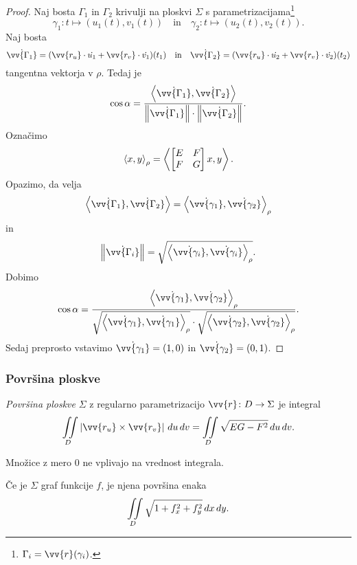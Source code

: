 
\begin{proof}
Naj bosta $\Gamma_1$ in $\Gamma_2$ krivulji na ploskvi $\Sigma$ s
parametrizacijama\footnote{$\Gamma_i = \vv{r}(\gamma_i)$.}
\[
\gamma_1 \colon t \mapsto (u_1(t), v_1(t))
\quad \text{in} \quad
\gamma_2 \colon t \mapsto (u_2(t), v_2(t)).
\]
Naj bosta
\[
\dot{\vv{\Gamma_1}} =
(\vv{r_u} \cdot \dot{u_1} + \vv{r_v} \cdot \dot{v_1})(t_1)
\quad \text{in} \quad
\dot{\vv{\Gamma_2}} =
(\vv{r_u} \cdot \dot{u_2} + \vv{r_v} \cdot \dot{v_2})(t_2)
\]
tangentna vektorja v $\rho$. Tedaj je
\[
\cos \alpha = \frac{\skl{\dot{\vv{\Gamma_1}}, \dot{\vv{\Gamma_2}}}}{\norm{\dot{\vv{\Gamma_1}}} \cdot \norm{\dot{\vv{\Gamma_2}}}}.
\]
Označimo
\[
\left\langle x,y\right\rangle_\rho = \left\langle 
\begin{bmatrix}
E & F \\
F & G
\end{bmatrix}
x, y\right\rangle.
\]
Opazimo, da velja
\[
\skl{\dot{\vv{\Gamma_1}}, \dot{\vv{\Gamma_2}}} =
\skl{\dot{\vv{\gamma_1}}, \dot{\vv{\gamma_2}}}_\rho
\]
in
\[
\norm{\dot{\vv{\Gamma_i}}} =
\sqrt{\skl{\dot{\vv{\gamma_i}}, \dot{\vv{\gamma_i}}}_\rho}.
\]
Dobimo
\[
\cos \alpha =
\frac{\skl{\dot{\vv{\gamma_1}}, \dot{\vv{\gamma_2}}}_\rho}
{\sqrt{\skl{\dot{\vv{\gamma_1}}, \dot{\vv{\gamma_1}}}_\rho}
\cdot
\sqrt{\skl{\dot{\vv{\gamma_2}}, \dot{\vv{\gamma_2}}}_\rho}}.
\]
Sedaj preprosto vstavimo $\dot{\vv{\gamma_1}} = (1,0)$ in
$\dot{\vv{\gamma_2}} = (0,1)$.
\end{proof}

\subsubsection{Površina ploskve}

\begin{definicija}
\emph{Površina ploskve} $\Sigma$ z
regularno parametrizacijo $\vv{r} \colon D \to \Sigma$ je integral
\[
\liint_D \abs{\vv{r_u} \times \vv{r_v}}\,du\,dv =
\liint_D \sqrt{EG - F^2}\,du\,dv.
\]
\end{definicija}

\begin{opomba}
Množice z mero $0$ ne vplivajo na vrednost integrala.
\end{opomba}

\begin{posledica}
Če je $\Sigma$ graf funkcije $f$, je njena površina enaka
\[
\iint\limits_D \sqrt{1 + f_x^2 + f_y^2}\,dx\,dy.
\]
\end{posledica}

